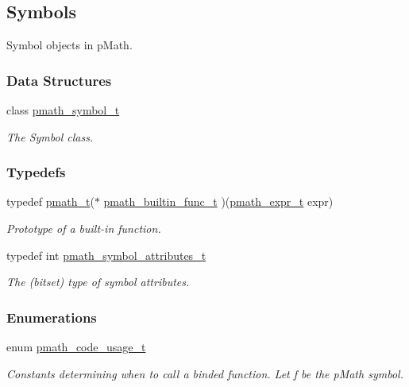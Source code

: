 \hypertarget{group__symbols}{
\subsection{Symbols}
\label{group__symbols}
}
Symbol objects in pMath.  


\subsubsection*{Data Structures}
\begin{CompactItemize}
\item 
class \hyperlink{classpmath__symbol__t}{pmath\_\-symbol\_\-t}
\begin{CompactList}\small\item\em The Symbol class. \item\end{CompactList}\end{CompactItemize}
\subsubsection*{Typedefs}
\begin{CompactItemize}
\item 
typedef \hyperlink{classpmath__t}{pmath\_\-t}($\ast$ \hyperlink{group__symbols_g4a74d7aeade34fc26c04ffde22ab1a1a}{pmath\_\-builtin\_\-func\_\-t} )(\hyperlink{classpmath__expr__t}{pmath\_\-expr\_\-t} expr)
\begin{CompactList}\small\item\em Prototype of a built-in function. \item\end{CompactList}\item 
typedef int \hyperlink{group__symbols_g5d508ec0d32d617b6c642de54907ee17}{pmath\_\-symbol\_\-attributes\_\-t}
\begin{CompactList}\small\item\em The (bitset) type of symbol attributes. \item\end{CompactList}\end{CompactItemize}
\subsubsection*{Enumerations}
\begin{CompactItemize}
\item 
enum \hyperlink{group__symbols_g957dfb51b09e821a8fc052835ea66670}{pmath\_\-code\_\-usage\_\-t} 
\begin{CompactList}\small\item\em Constants determining when to call a binded function. Let f be the pMath symbol. \item\end{CompactList}\end{CompactItemize}
